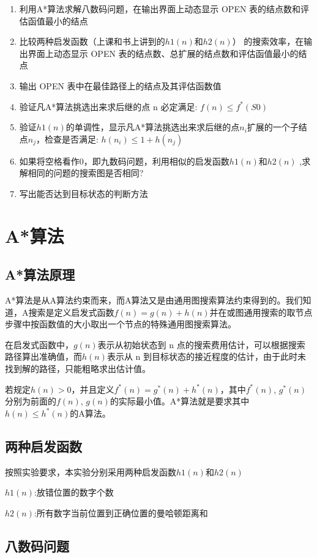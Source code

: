 \begin{enumerate}
\item 利用A*算法求解八数码问题，在输出界面上动态显示 OPEN 表的结点数和评估函值最小的结点
\item 比较两种启发函数（上课和书上讲到的$h1(n)$和$h2(n)$） 的搜索效率，在输出界面上动态显示 OPEN 表的结点数、总扩展的结点数和评估函值最小的结点
\item 输出 OPEN 表中在最佳路径上的结点及其评估函数值
\item 验证凡A*算法挑选出来求后继的点 n 必定满足: $f(n) \leq f^*(S0)$
\item 验证$h1(n)$的单调性，显示凡A*算法挑选出来求后继的点$n_i$扩展的一个子结点$n_j$，检查是否满足: $h(n_i) \leq 1 + h(n_j)$
\item 如果将空格看作0，即九数码问题，利用相似的启发函数$h1(n)$和$h2(n)$ ,求解相同的问题的搜索图是否相同?
\item 写出能否达到目标状态的判断方法
\end{enumerate}


\section{A*算法}

\subsection{A*算法原理}
A*算法是从A算法约束而来，而A算法又是由通用图搜索算法约束得到的。我们知道，A搜索是定义启发式函数$f(n) = g(n)+h(n)$并在或图通用搜索的取节点步骤中按函数值的大小取出一个节点的特殊通用图搜索算法。

在启发式函数中，$g(n)$表示从初始状态到 n 点的搜索费用估计，可以根据搜索路径算出准确值，而$h(n)$表示从 n 到目标状态的接近程度的估计，由于此时未找到解的路径，只能粗略求出估计值。

若规定$h(n) > 0$，并且定义$f^*(n) = g^*(n) + h^*(n)$，其中$f^*(n)$, $g^*(n)$分别为前面的$f(n)$, $g(n)$的实际最小值。A*算法就是要求其中$h(n) \leq h^*(n)$的A算法。

\subsection{两种启发函数}
按照实验要求，本实验分别采用两种启发函数$h1(n)$和$h2(n)$

$h1(n)$:放错位置的数字个数

$h2(n)$:所有数字当前位置到正确位置的曼哈顿距离和

\subsection{八数码问题}

